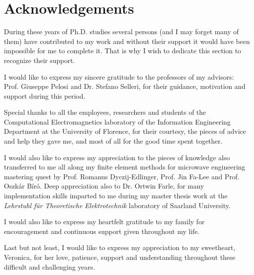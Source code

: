 \chapter*{Acknowledgements}

During these years of Ph.D. studies several persons (and I may forget many of them) have contributed to my work and without their support it would have been impossible for me to complete it. That is why I wish to dedicate this section to recognize their support.

I would like to express my sincere gratitude to the professors of my advisors: Prof. Giuseppe Pelosi and Dr. Stefano Selleri, for their guidance, motivation and support during this period.


Special thanks to all the employees, researchers and students of the Computational Electromagnetics laboratory of the Information Engineering Department at the University of Florence, for their courtesy, the pieces of advice and help they gave me, and most of all for the good time spent together.

I would also like to express my appreciation to the pieces of knowledge also transferred to me all along my finite element methods for microwave engineering mastering quest by Prof. Romanus Dyczij-Edlinger, Prof. Jin Fa-Lee and Prof. Oszk\'ar B\'ir\'o. Deep appreciation also to Dr. Ortwin Farle, for many implementation skills imparted to me during my master thesis work at the \textit{Lehrstuhl f\"ur Theoretische Elektrotechnik} laboratory of Saarland University.

I would also like to express my heartfelt gratitude to my family for encouragement
and continuous support given throughout my life.

Last but not least, I would like to express my appreciation to my sweetheart, Veronica, for her love, patience, support and understanding throughout these difficult and challenging years.